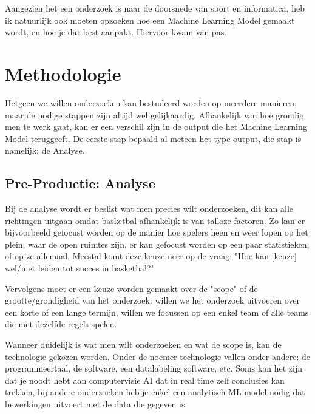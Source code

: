 \documentclass{hogent-article}
\begin{document}
Aangezien het een onderzoek is naar de doorsnede van sport en informatica, heb ik natuurlijk ook moeten opzoeken hoe een Machine Learning Model gemaakt wordt, en hoe je dat best aanpakt. Hiervoor kwam \autocite{BuildMLModel} van pas. 

\section{Methodologie}
Hetgeen we willen onderzoeken kan bestudeerd worden op meerdere manieren, maar de nodige stappen zijn altijd wel gelijkaardig. Afhankelijk van hoe grondig men te werk gaat, kan er een verschil zijn in de output die het Machine Learning Model teruggeeft. De eerste stap bepaald al meteen het type output, die stap is namelijk: de Analyse.

\subsection{Pre-Productie: Analyse}
Bij de analyse wordt er beslist wat men precies wilt onderzoeken, dit kan alle richtingen uitgaan omdat basketbal afhankelijk is van talloze factoren. Zo kan er bijvoorbeeld gefocust worden op de manier hoe spelers heen en weer lopen op het plein, waar de open ruimtes zijn, er kan gefocust worden op een paar statistieken, of op ze allemaal. Meestal komt deze keuze neer op de vraag: "Hoe kan [keuze] wel/niet leiden tot succes in basketbal?"

Vervolgens moet er een keuze worden gemaakt over de "scope" of de grootte/grondigheid van het onderzoek: willen we het onderzoek uitvoeren over een korte of een lange termijn, willen we focussen op een enkel team of alle teams die met dezelfde regels spelen.

Wanneer duidelijk is wat men wilt onderzoeken en wat de scope is, kan de technologie gekozen worden. Onder de noemer technologie vallen onder andere: de programmeertaal, de software, een datalabeling software, etc. Soms kan het zijn dat je noodt hebt aan computervisie AI dat in real time zelf conclusies kan trekken, bij andere onderzoeken heb je enkel een analytisch ML model nodig dat bewerkingen uitvoert met de data die gegeven is.
\end{document}
